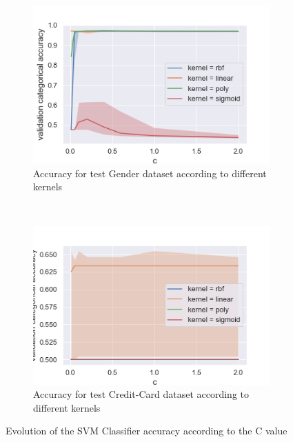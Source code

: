 \documentclass[10pt]{article}
\begin{document}
		\paragraph*{}
			\begin{figure}[h]
				\centering
				\begin{subfigure}[]{0.45\columnwidth}
					\centering
					\includegraphics[width=\linewidth]{../graphics/svm_gender_c_score_type_kernel.png}
					\caption{Accuracy for test Gender dataset according to different kernels}
					\label{svm:g_c}
				\end{subfigure}
				~
				\begin{subfigure}[]{0.45\columnwidth}
					\centering
					\includegraphics[width=\linewidth]{../graphics/svm_creditcard_c_score_type_kernel.png}
					\caption{Accuracy for test Credit-Card dataset according to different kernels}
					\label{svm:cc_c}
				\end{subfigure}
				\caption{Evolution of the SVM Classifier accuracy according to the C value}
				\label{svm:c}
			\end{figure}
\end{document}
